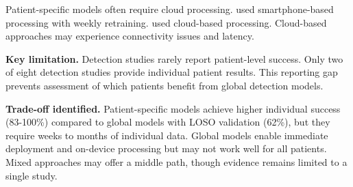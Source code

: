 Patient-specific models often require cloud processing. \textcite{stirlingForecastingSeizureLikelihood2021} used smartphone-based processing with weekly retraining. \textcite{nasseriAmbulatorySeizureForecasting2021} used cloud-based processing. Cloud-based approaches may experience connectivity issues and latency.

\textbf{Key limitation.} Detection studies rarely report patient-level success. Only two of eight detection studies provide individual patient results. This reporting gap prevents assessment of which patients benefit from global detection models.

\textbf{Trade-off identified.} Patient-specific models achieve higher individual success (83-100\%) compared to global models with LOSO validation (62\%), but they require weeks to months of individual data. Global models enable immediate deployment and on-device processing but may not work well for all patients. Mixed approaches may offer a middle path, though evidence remains limited to a single study.
